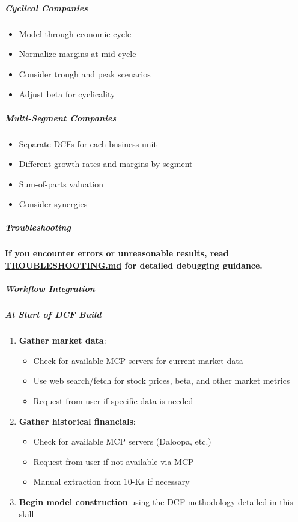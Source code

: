 \documentclass[11pt]{article}
\begin{document}
\subparagraph{Cyclical Companies}\mbox{}\par
\begin{itemize}[leftmargin=*,itemsep=2pt,topsep=2pt]
\item {} Model through economic cycle
\item {} Normalize margins at mid-cycle
\item {} Consider trough and peak scenarios
\item {} Adjust beta for cyclicality
\end{itemize}

\subparagraph{Multi-Segment Companies}\mbox{}\par
\begin{itemize}[leftmargin=*,itemsep=2pt,topsep=2pt]
\item {} Separate DCFs for each business unit
\item {} Different growth rates and margins by segment
\item {} Sum-of-parts valuation
\item {} Consider synergies
\end{itemize}

\subparagraph{Troubleshooting}\mbox{}\par

\textbf{If you encounter errors or unreasonable results, read \href{./TROUBLESHOOTING.md}{TROUBLESHOOTING.md} for detailed debugging guidance.}


\subparagraph{Workflow Integration}\mbox{}\par

\subparagraph{At Start of DCF Build}\mbox{}\par

\begin{enumerate}[leftmargin=*,itemsep=2pt,topsep=2pt]
\item {} \textbf{Gather market data}:
\begin{itemize}[leftmargin=*,itemsep=2pt,topsep=2pt]
\item {} Check for available MCP servers for current market data
\item {} Use web search/fetch for stock prices, beta, and other market metrics
\item {} Request from user if specific data is needed
\end{itemize}
\item {} \textbf{Gather historical financials}:
\begin{itemize}[leftmargin=*,itemsep=2pt,topsep=2pt]
\item {} Check for available MCP servers (Daloopa, etc.)
\item {} Request from user if not available via MCP
\item {} Manual extraction from 10-Ks if necessary
\end{itemize}
\item {} \textbf{Begin model construction} using the DCF methodology detailed in this skill
\end{enumerate}
\end{document}
